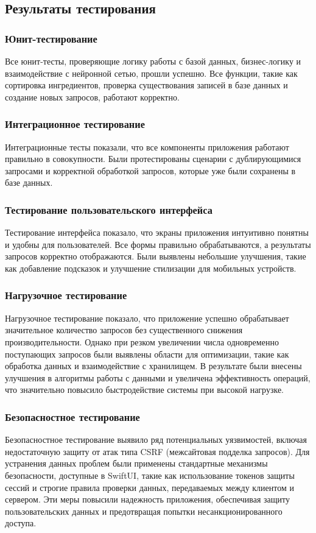 {\subsection{Результаты тестирования}

\subsubsection*{Юнит-тестирование}
Все юнит-тесты, проверяющие логику работы с базой данных, бизнес-логику и взаимодействие с нейронной сетью, прошли успешно. Все функции, такие как сортировка ингредиентов, проверка существования записей в базе данных и создание новых запросов, работают корректно.

\subsubsection*{Интеграционное тестирование}
Интеграционные тесты показали, что все компоненты приложения работают правильно в совокупности. Были протестированы сценарии с дублирующимися запросами и корректной обработкой запросов, которые уже были сохранены в базе данных.

\subsubsection*{Тестирование пользовательского интерфейса}
Тестирование интерфейса показало, что экраны приложения интуитивно понятны и удобны для пользователей. Все формы правильно обрабатываются, а результаты запросов корректно отображаются. Были выявлены небольшие улучшения, такие как добавление подсказок и улучшение стилизации для мобильных устройств.

\subsubsection*{Нагрузочное тестирование}
Нагрузочное тестирование показало, что приложение успешно обрабатывает значительное количество запросов без существенного снижения производительности. Однако при резком увеличении числа одновременно поступающих запросов были выявлены области для оптимизации, такие как обработка данных и взаимодействие с хранилищем. В результате были внесены улучшения в алгоритмы работы с данными и увеличена эффективность операций, что значительно повысило быстродействие системы при высокой нагрузке.

\subsubsection*{Безопасностное тестирование}
Безопасностное тестирование выявило ряд потенциальных уязвимостей, включая недостаточную защиту от атак типа CSRF (межсайтовая подделка запросов). Для устранения данных проблем были применены стандартные механизмы безопасности, доступные в SwiftUI, такие как использование токенов защиты сессий и строгие правила проверки данных, передаваемых между клиентом и сервером. Эти меры повысили надежность приложения, обеспечивая защиту пользовательских данных и предотвращая попытки несанкционированного доступа.

}
